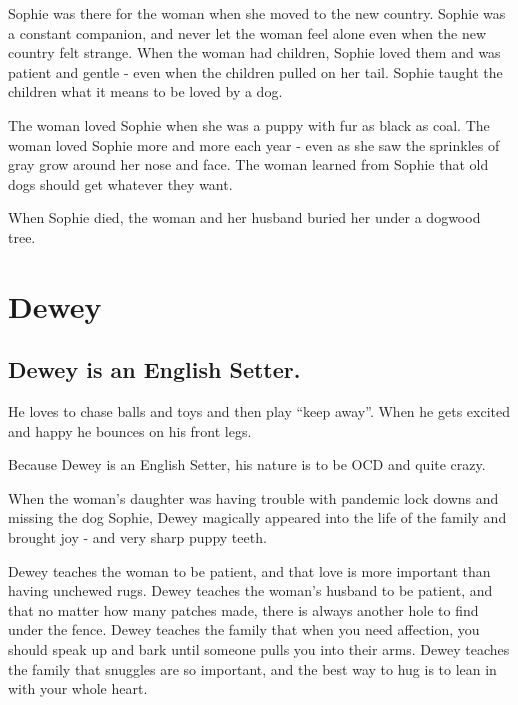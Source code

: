 \documentclass[
  openany]{book}
\begin{document}
Sophie was there for the woman when she moved to the new country.
Sophie was a constant companion, and never let the woman feel alone even when the new country felt strange.
When the woman had children, Sophie loved them and was patient and gentle - even when the children pulled on her tail.
Sophie taught the children what it means to be loved by a dog.

The woman loved Sophie when she was a puppy with fur as black as coal.
The woman loved Sophie more and more each year - even as she saw the sprinkles of gray grow around her nose and face.
The woman learned from Sophie that old dogs should get whatever they want.

When Sophie died, the woman and her husband buried her under a dogwood tree.

\hypertarget{dewey}{%
\chapter{Dewey}\label{dewey}}

\hypertarget{dewey-is-an-english-setter.}{%
\section{Dewey is an English Setter.}\label{dewey-is-an-english-setter.}}

He loves to chase balls and toys and then play ``keep away''.
When he gets excited and happy he bounces on his front legs.

Because Dewey is an English Setter, his nature is to be OCD and quite crazy.

When the woman's daughter was having trouble with pandemic lock downs and missing the dog Sophie,
Dewey magically appeared into the life of the family and brought joy - and very sharp puppy teeth.

Dewey teaches the woman to be patient, and that love is more important than having unchewed rugs.
Dewey teaches the woman's husband to be patient, and that no matter how many patches made, there is always another hole to find under the fence.
Dewey teaches the family that when you need affection, you should speak up and bark until someone pulls you into their arms.
Dewey teaches the family that snuggles are so important, and the best way to hug is to lean in with your whole heart.
\end{document}
